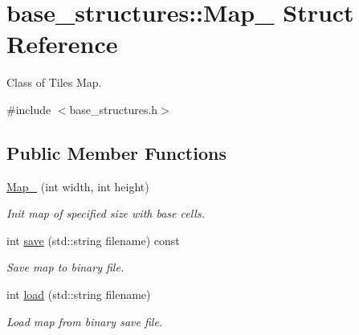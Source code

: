 \hypertarget{structbase__structures_1_1Map__}{}\section{base\+\_\+structures\+:\+:Map\+\_\+ Struct Reference}
\label{structbase__structures_1_1Map__}


Class of Tiles Map.  




{\ttfamily \#include $<$base\+\_\+structures.\+h$>$}

\subsection*{Public Member Functions}
\begin{DoxyCompactItemize}
\item 
\mbox{\label{structbase__structures_1_1Map___a15d4b8b311a21be26c0457869420296e}} 
\hyperlink{structbase__structures_1_1Map___a15d4b8b311a21be26c0457869420296e}{Map\+\_\+} (int width, int height)
\begin{DoxyCompactList}\small\item\em Init map of specified size with base cells. \end{DoxyCompactList}\item 
\mbox{\label{structbase__structures_1_1Map___abd1176ca5512a52c41a833ff0d0f706c}} 
int \hyperlink{structbase__structures_1_1Map___abd1176ca5512a52c41a833ff0d0f706c}{save} (std\+::string filename) const
\begin{DoxyCompactList}\small\item\em Save map to binary file. \end{DoxyCompactList}\item 
\mbox{\label{structbase__structures_1_1Map___a2ad46f13ba2fe0d09f6d042e23be2cbb}} 
int \hyperlink{structbase__structures_1_1Map___a2ad46f13ba2fe0d09f6d042e23be2cbb}{load} (std\+::string filename)
\begin{DoxyCompactList}\small\item\em Load map from binary save file. \end{DoxyCompactList}\end{DoxyCompactItemize}
